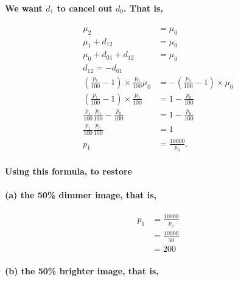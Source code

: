 \documentclass[11pt]{article}
\begin{document}
\hypertarget{we-want-d_1-to-cancel-out-d_0.-that-is}{%
\paragraph{\texorpdfstring{We want \(d_1\) to cancel out \(d_0\). That
is,}{We want d\_1 to cancel out d\_0. That is,}}\label{we-want-d_1-to-cancel-out-d_0.-that-is}}

\[
\begin{equation}
    \begin{split}
        \mu_2 & = \mu_0 \\
        \mu_1+d_{12} & = \mu_0 \\
        \mu_0+d_{01}+d_{12} & = \mu_0 \\
        d_{12} = -d_{01} \\
        (\frac{p_1}{100}-1) \times \frac{p_0}{100} \mu_0 & = - (\frac{p_0}{100}-1) \times \mu_0 \\
        (\frac{p_1}{100}-1) \times \frac{p_0}{100} & = 1 - \frac{p_0}{100} \\
        \frac{p_1}{100} \frac{p_0}{100} - \frac{p_0}{100} & = 1 - \frac{p_0}{100} \\
        \frac{p_1}{100} \frac{p_0}{100} & = 1 \\
        p_1 & = \frac{10000}{p_0}.
    \end{split}
\end{equation}
\]

\hypertarget{using-this-formula-to-restore}{%
\paragraph{Using this formula, to
restore}\label{using-this-formula-to-restore}}

\hypertarget{a-the-50-dimmer-image-that-is}{%
\paragraph{(a) the 50\% dimmer image, that
is,}\label{a-the-50-dimmer-image-that-is}}

\[
\begin{equation}
    \begin{split}
        p_1 & = \frac{10000}{p_0} \\
            & = \frac{10000}{50} \\
            & = 200
    \end{split}
\end{equation}
\]

\hypertarget{b-the-50-brighter-image-that-is}{%
\paragraph{(b) the 50\% brighter image, that
is,}\label{b-the-50-brighter-image-that-is}}
\end{document}
